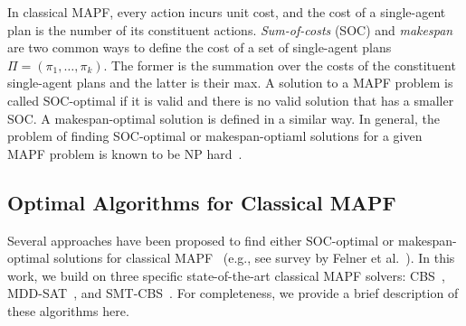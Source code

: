 \documentclass[review]{elsarticle}
\newcommand\konstantin[1]{\nb{\textbf{Konstantin:}}{red}{#1}}
\newcommand\roni[1]{\nb{\textbf{Roni:}}{green}{#1}}
\newcommand\dor[1]{\nb{\textbf{Dor:}}{Fuchsia}{#1}}
\newcommand{\cbs}{\ac{CBS}\xspace}
\newcommand{\mddsat}{MDD-SAT\xspace}
\newcommand{\smtcbsO}{SMT-CBS\xspace} %
\newcommand{\mapf}{\ac{MAPF}\xspace}
\begin{document}

In classical MAPF, every action incurs unit cost, 
and the cost of a single-agent plan is the number of its constituent actions. 
\emph{Sum-of-costs} (SOC) and \emph{makespan} are two common ways to define the cost of a set of single-agent plans $\Pi=(\pi_1,\ldots, \pi_k)$. The former is the summation over the costs of the constituent single-agent plans and the latter is their max. A solution to a \mapf problem is called SOC-optimal if it is valid and there is no valid solution that has a smaller SOC. A makespan-optimal solution is defined in a similar way. 
In general, the problem of finding SOC-optimal or makespan-optiaml solutions for a given \mapf problem is known to be NP hard~\cite{yu2013multi,surynek2010optimization}.



\subsection{Optimal Algorithms for Classical \mapf}
Several approaches have been proposed to find either SOC-optimal or makespan-optimal solutions for classical \mapf~ 
(e.g., see survey by Felner et al.~\cite{felner2017searchBased}). 
In this work, we build on three specific state-of-the-art classical \mapf solvers: \cbs~\cite{sharon2015conflict},   \mddsat~\cite{DBLP:conf/ecai/SurynekFSB16}, and \smtcbsO~\cite{DBLP:conf/ijcai/Surynek19}. 
For completeness, we provide a brief description of these algorithms here. 
\end{document}
